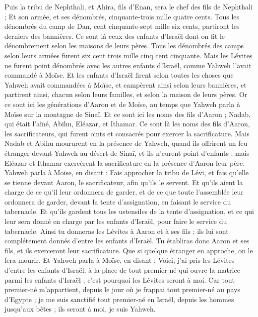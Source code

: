 \begin{multicols}{2}
Puis la tribu de Nephthali, et Ahira, fils d'Enan, sera le chef des fils de Nephthali ;
Et son armée, et ses dénombrés, cinquante-trois mille quatre cents.
Tous les dénombrés du camp de Dan, cent cinquante-sept mille six cents, partiront les derniers des bannières.
Ce sont là ceux des enfants d'Israël dont on fit le dénombrement selon les maisons de leurs pères. Tous les dénombrés des camps selon leurs armées furent six cent trois mille cinq cent cinquante.
Mais les Lévites ne furent point dénombrés avec les autres enfants d'Israël, comme Yahweh l'avait commandé à Moïse.
Et les enfants d'Israël firent selon toutes les choses que Yahweh avait commandées à Moïse, et campèrent ainsi selon leurs bannières, et partirent ainsi, chacun selon leurs familles, et selon la maison de leurs pères.
\VerseOne{}Or ce sont ici les générations d'Aaron et de Moïse, au temps que Yahweh parla à Moïse sur la montagne de Sinaï.
Et ce sont ici les noms des fils d'Aaron ; Nadab, qui était l'aîné, Abihu, Eléazar, et Ithamar.
Ce sont là les noms des fils d'Aaron, les sacrificateurs, qui furent oints et consacrés pour exercer la sacrificature.
Mais Nadab et Abihu moururent en la présence de Yahweh, quand ils offrirent un feu étranger devant Yahweh au désert de Sinaï, et ils n'eurent point d'enfants ; mais Eléazar et Ithamar exercèrent la sacrificature en la présence d'Aaron leur père.
Yahweh parla à Moïse, en disant :
Fais approcher la tribu de Lévi, et fais qu'elle se tienne devant Aaron, le sacrificateur, afin qu'ils le servent.
Et qu'ils aient la charge de ce qu'il leur ordonnera de garder, et de ce que toute l'assemblée leur ordonnera de garder, devant la tente d'assignation, en faisant le service du tabernacle.
Et qu'ils gardent tous les ustensiles de la tente d'assignation, et ce qui leur sera donné en charge par les enfants d'Israël, pour faire le service du tabernacle.
Ainsi tu donneras les Lévites à Aaron et à ses fils ; ils lui sont complétement donnés d'entre les enfants d'Israël.
Tu établiras donc Aaron et ses fils, et ils exerceront leur sacrificature. Que si quelque étranger en approche, on le fera mourir.
Et Yahweh parla à Moïse, en disant :
Voici, j'ai pris les Lévites d'entre les enfants d'Israël, à la place de tout premier-né qui ouvre la matrice parmi les enfants d'Israël ; c'est pourquoi les Lévites seront à moi.
Car tout premier-né m'appartient, depuis le jour où je frappai tout premier-né au pays d'Egypte ; je me suis sanctifié tout premier-né en Israël, depuis les hommes jusqu'aux bêtes ; ils seront à moi, je suis Yahweh.

\end{multicols}

